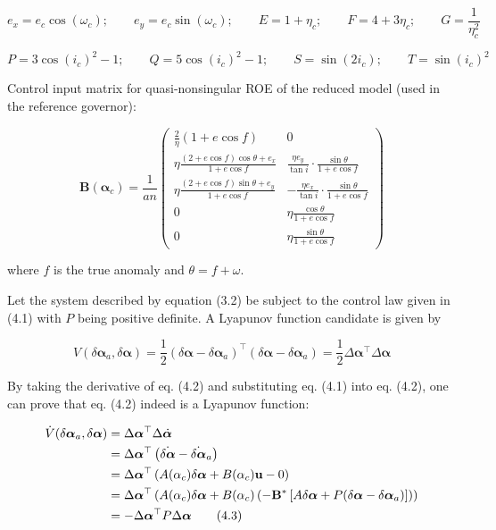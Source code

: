 \[
e_x = e_c \cos(\omega_c); \qquad e_y = e_c \sin(\omega_c); \qquad E = 1 + \eta_c; \qquad F = 4 + 3 \eta_c; \qquad G = \frac{1}{\eta_c^2}
\]

\[
P = 3 \cos(i_c)^2 - 1; \qquad Q = 5 \cos(i_c)^2 - 1; \qquad S = \sin(2 i_c); \qquad T = \sin(i_c)^2
\]

Control input matrix for quasi-nonsingular ROE of the reduced model (used in the reference governor):

\begin{equation}
\bm{B}(\bm{\alpha}_c) = \frac{1}{a n}
\begin{pmatrix}
\frac{2}{\eta}(1 + e \cos f) & 0 \\
\eta \frac{(2 + e \cos f) \cos \theta + e_x}{1 + e \cos f} & \frac{\eta e_y}{\tan i} \cdot \frac{\sin \theta}{1 + e \cos f} \\
\eta \frac{(2 + e \cos f) \sin \theta + e_y}{1 + e \cos f} & -\frac{\eta e_x}{\tan i} \cdot \frac{\sin \theta}{1 + e \cos f} \\
0 & \eta \frac{\cos \theta}{1 + e \cos f} \\
0 & \eta \frac{\sin \theta}{1 + e \cos f}
\end{pmatrix}
\tag{A.8}
\end{equation}

where \( f \) is the true anomaly and \( \theta = f + \omega \).

Let the system described by equation (3.2) be subject to the control law given in (4.1) with $P$ being positive definite. A Lyapunov function candidate is given by

\begin{equation}
V(\delta \boldsymbol{\alpha}_a, \delta \boldsymbol{\alpha}) = \frac{1}{2} (\delta \boldsymbol{\alpha} - \delta \boldsymbol{\alpha}_a)^\top (\delta \boldsymbol{\alpha} - \delta \boldsymbol{\alpha}_a) 
= \frac{1}{2} \Delta \boldsymbol{\alpha}^\top \Delta \boldsymbol{\alpha}
\tag{4.2}
\end{equation}

By taking the derivative of eq. (4.2) and substituting eq. (4.1) into eq. (4.2), one can prove that eq. (4.2) indeed is a Lyapunov function:

\begin{align}
\dot{V}(\delta \boldsymbol{\alpha}_a, \delta \boldsymbol{\alpha}) 
&= \Delta \boldsymbol{\alpha}^\top \Delta \dot{\boldsymbol{\alpha}} \notag \\
&= \Delta \boldsymbol{\alpha}^\top \left( \dot{\delta \boldsymbol{\alpha}} - \dot{\delta \boldsymbol{\alpha}}_a \right) \notag \\
&= \Delta \boldsymbol{\alpha}^\top \left( A(\alpha_c) \delta \boldsymbol{\alpha} + B(\alpha_c) \mathbf{u} - 0 \right) \notag \\
&= \Delta \boldsymbol{\alpha}^\top \left( A(\alpha_c) \delta \boldsymbol{\alpha} + B(\alpha_c) \left( -\mathbf{B}^* \left[ A \delta \boldsymbol{\alpha} + P(\delta \boldsymbol{\alpha} - \delta \boldsymbol{\alpha}_a) \right] \right) \right) \notag \\
&= -\Delta \boldsymbol{\alpha}^\top P \Delta \boldsymbol{\alpha}
\tag{4.3}
\end{align}

